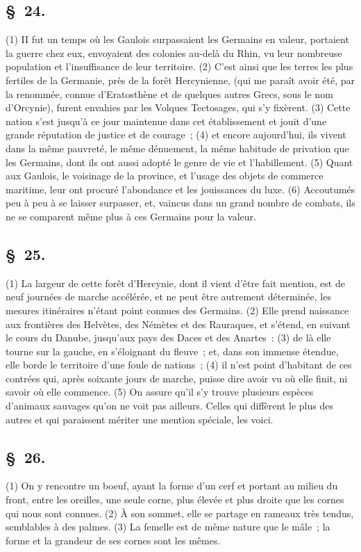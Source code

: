 \documentclass[french,twoside]{book} %
\begin{document}
\subsection[{§ 24.}]{ \textsc{§ 24.} }
\noindent (1) II fut un temps où les Gaulois surpassaient les Germains en valeur, portaient la guerre chez eux, envoyaient des colonies au-delà du Rhin, vu leur nombreuse population et l’insuffisance de leur territoire. (2) C'est ainsi que les terres les plus fertiles de la Germanie, près de la forêt Hercynienne, (qui me paraît avoir été, par la renommée, connue d’Eratosthène et de quelques autres Grecs, sous le nom d’Orcynie), furent envahies par les Volques Tectosages, qui s’y fixèrent. (3) Cette nation s’est jusqu’à ce jour maintenue dans cet établissement et jouit d’une grande réputation de justice et de courage ; (4) et encore aujourd’hui, ils vivent dans la même pauvreté, le même dénuement, la même habitude de privation que les Germains, dont ils ont aussi adopté le genre de vie et l’habillement. (5) Quant aux Gaulois, le voisinage de la province, et l’usage des objets de commerce maritime, leur ont procuré l’abondance et les jouissances du luxe. (6) Accoutumés peu à peu à se laisser surpasser, et, vaincus dans un grand nombre de combats, ils ne se comparent même plus à ces Germains pour la valeur.
\subsection[{§ 25.}]{ \textsc{§ 25.} }
\noindent (1) La largeur de cette forêt d’Hercynie, dont il vient d’être fait mention, est de neuf journées de marche accélérée, et ne peut être autrement déterminée, les mesures itinéraires n’étant point connues des Germains. (2) Elle prend naissance aux frontières des Helvètes, des Némètes et des Rauraques, et s’étend, en suivant le cours du Danube, jusqu’aux pays des Daces et des Anartes : (3) de là elle tourne sur la gauche, en s’éloignant du fleuve ; et, dans son immense étendue, elle borde le territoire d’une foule de nations ; (4) il n’est point d’habitant de ces contrées qui, après soixante jours de marche, puisse dire avoir vu où elle finit, ni savoir où elle commence. (5) On assure qu’il s’y trouve plusieurs espèces d’animaux sauvages qu’on ne voit pas ailleurs. Celles qui diffèrent le plus des autres et qui paraissent mériter une mention spéciale, les voici.
\subsection[{§ 26.}]{ \textsc{§ 26.} }
\noindent (1) On y rencontre un boeuf, ayant la forme d’un cerf et portant au milieu du front, entre les oreilles, une seule corne, plus élevée et plus droite que les cornes qui nous sont connues. (2) À son sommet, elle se partage en rameaux très tendus, semblables à des palmes. (3) La femelle est de même nature que le mâle ; la forme et la grandeur de ses cornes sont les mêmes.
\end{document}

